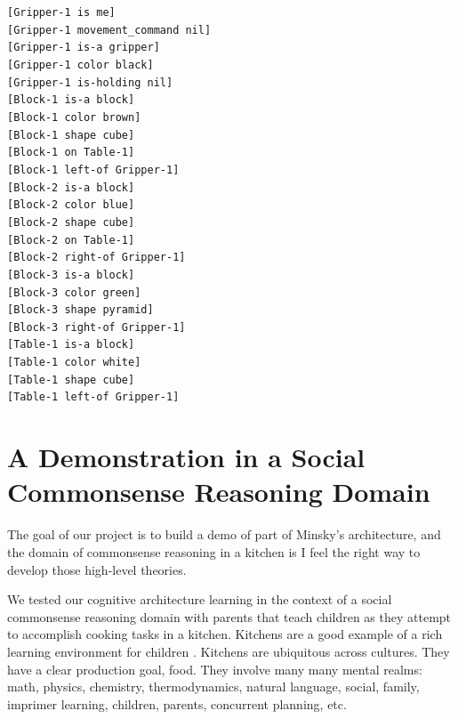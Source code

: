 \begin{tabular}[l]
  \tt{[Gripper-1 is me]} \\
  \tt{[Gripper-1 movement\_command nil]} \\
  \tt{[Gripper-1 is-a gripper]} \\
  \tt{[Gripper-1 color black]} \\
  \tt{[Gripper-1 is-holding nil]} \\
  \tt{[Block-1 is-a block]} \\
  \tt{[Block-1 color brown]} \\
  \tt{[Block-1 shape cube]} \\
  \tt{[Block-1 on Table-1]} \\
  \tt{[Block-1 left-of Gripper-1]} \\
  \tt{[Block-2 is-a block]} \\
  \tt{[Block-2 color blue]} \\
  \tt{[Block-2 shape cube]} \\
  \tt{[Block-2 on Table-1]} \\
  \tt{[Block-2 right-of Gripper-1]} \\
  \tt{[Block-3 is-a block]} \\
  \tt{[Block-3 color green]} \\
  \tt{[Block-3 shape pyramid]} \\
  \tt{[Block-3 right-of Gripper-1]} \\
  \tt{[Table-1 is-a block]} \\
  \tt{[Table-1 color white]} \\
  \tt{[Table-1 shape cube]} \\
  \tt{[Table-1 left-of Gripper-1]}
\end{tabular}





\section{A Demonstration in a Social Commonsense Reasoning Domain}

The goal of our project is to build a demo of part of Minsky's
architecture, and the domain of commonsense reasoning in a kitchen is
I feel the right way to develop those high-level theories.

We tested our cognitive architecture learning in the context of a
social commonsense reasoning domain with parents that teach children
as they attempt to accomplish cooking tasks in a kitchen.  Kitchens
are a good example of a rich learning environment for children
\citep{dewey:1907}.  Kitchens are ubiquitous across cultures.  They
have a clear production goal, food.  They involve many many mental
realms: math, physics, chemistry, thermodynamics, natural language,
social, family, imprimer learning, children, parents, concurrent
planning, etc.

